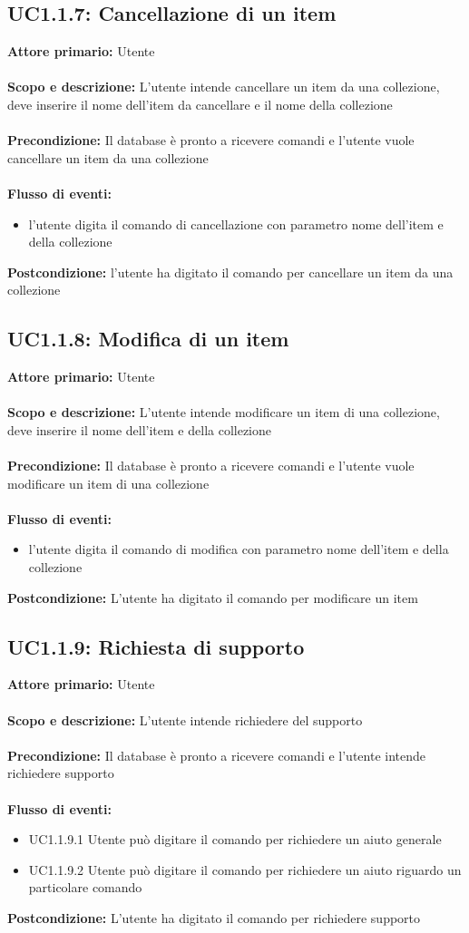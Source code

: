 \documentclass{scalatekids-article}
\begin{document}
\subsection{UC1.1.7: Cancellazione di un item}
\textbf{Attore primario:} Utente \\ \\
\textbf{Scopo e descrizione:} L’utente intende cancellare un item da una collezione, deve inserire il nome dell’item da cancellare e il nome della collezione\\ \\
\textbf{Precondizione:} Il database è pronto a ricevere comandi e l’utente vuole cancellare un item da una collezione\\ \\
\textbf{Flusso di eventi:}
\begin{itemize}
\item l’utente digita il comando di cancellazione con parametro nome dell’item e della collezione
\end{itemize}
\textbf{Postcondizione:} l’utente ha digitato il comando per cancellare un item da una collezione
\subsection{UC1.1.8: Modifica di un item}
\textbf{Attore primario:} Utente \\ \\
\textbf{Scopo e descrizione:} L’utente intende modificare un item di una collezione, deve inserire il nome dell’item e della collezione\\ \\
\textbf{Precondizione:} Il database è pronto a ricevere comandi e l’utente vuole modificare un item di una collezione\\ \\
\textbf{Flusso di eventi:}
\begin{itemize}
\item l’utente digita il comando di modifica con parametro nome dell’item e della collezione
\end{itemize}
\textbf{Postcondizione:} L’utente ha digitato il comando per modificare un item
\subsection{UC1.1.9: Richiesta di supporto}
\textbf{Attore primario:} Utente \\ \\
\textbf{Scopo e descrizione:} L’utente intende richiedere del supporto\\ \\
\textbf{Precondizione:} Il database è pronto a ricevere comandi e l’utente intende richiedere supporto\\ \\
\textbf{Flusso di eventi:}
\begin{itemize}
\item UC1.1.9.1 Utente può digitare il comando per richiedere un aiuto generale
\item UC1.1.9.2 Utente può digitare il comando per richiedere un aiuto riguardo un particolare comando
\end{itemize}
\textbf{Postcondizione:} L’utente ha digitato il comando per richiedere supporto
\end{document}
